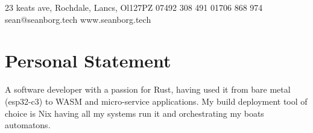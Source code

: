 \documentclass{my_cv}
\begin{document}
\contactInfo
{23 keats ave, Rochdale, Lancs, Ol127PZ}
{07492 308 491}
{01706 868 974}
{sean@seanborg.tech}
{www.seanborg.tech}

\section{Personal Statement}

A software developer with a passion for Rust, having used it from bare metal (esp32-c3) to WASM and micro-service applications. My build deployment tool of choice is Nix having all my systems run it and orchestrating my boats automatons.



\end{document}
